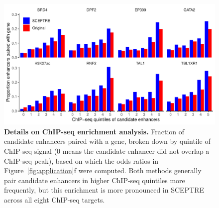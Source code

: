 \documentclass{nature}
\begin{document}
\clearpage
\thispagestyle{empty} 
\begin{figure}[h!]
	\includegraphics[width = \textwidth]{figures/FigureS3/FigureS3.pdf}
	\caption{\textbf{Details on ChIP-seq enrichment analysis.} Fraction of candidate enhancers paired with a gene, broken down by quintile of ChIP-seq signal (0 means the candidate enhancer did not overlap a ChIP-seq peak), based on which the odds ratios in Figure~\ref{fig:application}f were computed. Both methods generally pair candidate enhancers in higher ChIP-seq quintiles more frequently, but this enrichment is more pronounced in SCEPTRE across all eight ChIP-seq targets.}
	\label{fig:chipseq-enrichment-details}
\end{figure}
\end{document}
